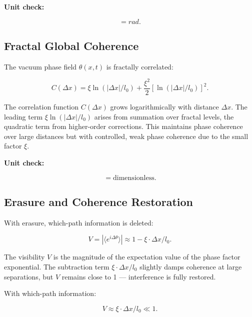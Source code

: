 	\textbf{Unit check:}
	
	\begin{equation}
		[\Delta \theta] = \si{rad}.
	\end{equation}
	
	\subsection*{Fractal Global Coherence}
	
	The vacuum phase field \(\theta(x,t)\) is fractally correlated:
	
	\begin{equation}
		C(\Delta x) = \xi \ln(|\Delta x|/l_0) + \frac{\xi^2}{2} [\ln(|\Delta x|/l_0)]^2.
	\end{equation}
	
	The correlation function \(C(\Delta x)\) grows logarithmically with distance \(\Delta x\). The leading term \(\xi \ln(|\Delta x|/l_0)\) arises from summation over fractal levels, the quadratic term from higher-order corrections. This maintains phase coherence over large distances but with controlled, weak phase coherence due to the small factor \(\xi\).
	
	\textbf{Unit check:}
	
	\begin{equation}
		[C(\Delta x)] = \text{dimensionless}.
	\end{equation}
	
	\subsection*{Erasure and Coherence Restoration}
	
	With erasure, which-path information is deleted:
	
	\begin{equation}
		V = |\langle e^{i \Delta \theta} \rangle| \approx 1 - \xi \cdot \Delta x / l_0.
	\end{equation}
	
	The visibility \(V\) is the magnitude of the expectation value of the phase factor exponential. The subtraction term \(\xi \cdot \Delta x / l_0\) slightly damps coherence at large separations, but \(V\) remains close to 1 — interference is fully restored.
	
	With which-path information:
	
	\begin{equation}
		V \approx \xi \cdot \Delta x / l_0 \ll 1.
	\end{equation}
	
